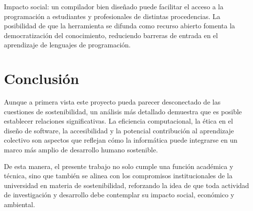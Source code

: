Impacto social: un compilador bien diseñado puede facilitar el acceso a la programación a estudiantes y profesionales de distintas procedencias. La posibilidad de que la herramienta se difunda como recurso abierto fomenta la democratización del conocimiento, reduciendo barreras de entrada en el aprendizaje de lenguajes de programación.

\section{Conclusión}
Aunque a primera vista este proyecto pueda parecer desconectado de las cuestiones de sostenibilidad, un análisis más detallado demuestra que es posible establecer relaciones significativas. La eficiencia computacional, la ética en el diseño de software, la accesibilidad y la potencial contribución al aprendizaje colectivo son aspectos que reflejan cómo la informática puede integrarse en un marco más amplio de desarrollo humano sostenible.

De esta manera, el presente trabajo no solo cumple una función académica y técnica, sino que también se alinea con los compromisos institucionales de la universidad en materia de sostenibilidad, reforzando la idea de que toda actividad de investigación y desarrollo debe contemplar su impacto social, económico y ambiental.